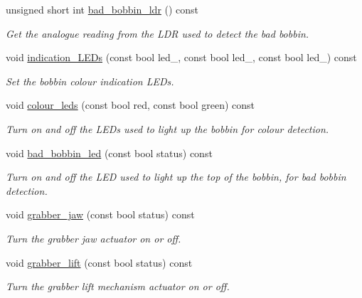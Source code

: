 \begin{DoxyCompactItemize}
unsigned short int \hyperlink{classIDP_1_1HardwareAbstractionLayer_af4a8cb5072cf89263b97a3e8e1727da8}{bad\_\-bobbin\_\-ldr} () const 
\begin{DoxyCompactList}\small\item\em Get the analogue reading from the LDR used to detect the bad bobbin. \item\end{DoxyCompactList}\item 
void \hyperlink{classIDP_1_1HardwareAbstractionLayer_af776086df3d861a8bec53637c91b84ab}{indication\_\-LEDs} (const bool led\_, const bool led\_, const bool led\_) const 
\begin{DoxyCompactList}\small\item\em Set the bobbin colour indication LEDs. \item\end{DoxyCompactList}\item 
void \hyperlink{classIDP_1_1HardwareAbstractionLayer_a6034826727571aec7d30999d8c88fa80}{colour\_\-leds} (const bool red, const bool green) const 
\begin{DoxyCompactList}\small\item\em Turn on and off the LEDs used to light up the bobbin for colour detection. \item\end{DoxyCompactList}\item 
void \hyperlink{classIDP_1_1HardwareAbstractionLayer_a7e687c2254a9bfba55ff99ce191c27ae}{bad\_\-bobbin\_\-led} (const bool status) const 
\begin{DoxyCompactList}\small\item\em Turn on and off the LED used to light up the top of the bobbin, for bad bobbin detection. \item\end{DoxyCompactList}\item 
void \hyperlink{classIDP_1_1HardwareAbstractionLayer_a577c1794c61814c3b23f5017437aba97}{grabber\_\-jaw} (const bool status) const 
\begin{DoxyCompactList}\small\item\em Turn the grabber jaw actuator on or off. \item\end{DoxyCompactList}\item 
void \hyperlink{classIDP_1_1HardwareAbstractionLayer_a0bf933820024212953433404e981be16}{grabber\_\-lift} (const bool status) const 
\begin{DoxyCompactList}\small\item\em Turn the grabber lift mechanism actuator on or off. \item\end{DoxyCompactList}\end{DoxyCompactItemize}


